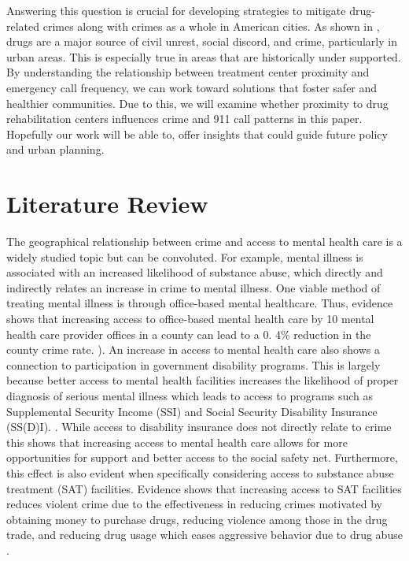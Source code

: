 \documentclass[12pt]{article}
\begin{document}
Answering this question is crucial for developing strategies to mitigate drug-related crimes along with crimes as a whole in American cities. As shown in \cite{SAT_centers_and_crime}, drugs are a major source of civil unrest, social discord, and crime, particularly in urban areas. This is especially true in areas that are historically under supported. By understanding the relationship between treatment center proximity and emergency call frequency, we can work toward solutions that foster safer and healthier communities. Due to this, we will examine whether proximity to drug rehabilitation centers influences crime and 911 call patterns in this paper. Hopefully our work will be able to, offer insights that could guide future policy and urban planning.




\section{Literature Review} \label{sec:literature}
    The geographical relationship between crime and access to mental health care is a widely studied topic but can be convoluted. For example, mental illness is associated with an increased likelihood of substance abuse, which directly and indirectly relates an increase in crime to mental illness. One viable method of treating mental illness is through office-based mental healthcare. Thus, evidence shows that increasing access to office-based mental health care by 10 mental health care provider offices in a county can lead to a 0. 4\% reduction in the county crime rate. \cite{mental_healthcare_and_crime}). An increase in access to mental health care also shows a connection to participation in government disability programs. This is largely because better access to mental health facilities increases the likelihood of proper diagnosis of serious mental illness which leads to access to programs such as Supplemental Security Income (SSI) and Social Security Disability Insurance (SS(D)I). \cite{mental_health_and_disability}. While access to disability insurance does not directly relate to crime this shows that increasing access to mental health care allows for more opportunities for support and better access to the social safety net. Furthermore, this effect is also evident when specifically considering access to substance abuse treatment (SAT) facilities. Evidence shows that increasing access to SAT facilities reduces violent crime due to the effectiveness in reducing crimes motivated by obtaining money to purchase drugs, reducing violence among those in the drug trade, and reducing drug usage which eases aggressive behavior due to drug abuse \cite{SAT_centers_and_crime}. 
\end{document}
